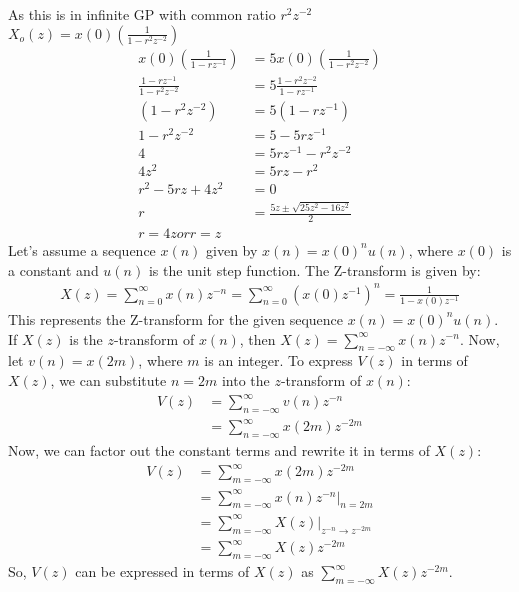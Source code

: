 \documentclass{article}
\begin{document}
As this is in infinite GP with common ratio $r^{2}z^{-2}$\\
$X_o(z)= x(0)\left(\frac{1}{1 - r^2z^{-2}}\right)$ \\
\begin{align}
x(0)\left(\frac{1}{1 - rz^{-1}}\right) &= 5 x(0)\left(\frac{1}{1 - r^2z^{-2}}\right) \\
\frac{1 - rz^{-1}}{1 - r^2z^{-2}} &= 5 \frac{1 - r^2z^{-2}}{1 - rz^{-1}} \\
(1 - r^2z^{-2}) &= 5 (1 - rz^{-1}) \\
1 - r^2z^{-2} &= 5 - 5rz^{-1} \\
4 &= 5rz^{-1} - r^2z^{-2} \\
4z^2 &= 5rz - r^2 \\
r^2 - 5rz + 4z^2 &= 0 \\
r &= \frac{5z \pm \sqrt{25z^2 - 16z^2}}{2}\\
r=4z or r=z
\end{align}
Let's assume a sequence \( x(n) \) given by \( x(n) =x(0)^n u(n) \), where \( x(0) \) is a constant and \( u(n) \) is the unit step function.
The Z-transform is given by:
\begin{align}
X(z) = \sum_{n=0}^{\infty} x(n)z^{-n} = \sum_{n=0}^{\infty} (x(0)z^{-1})^n = \frac{1}{1 - x(0)z^{-1}} 
\end{align}
This represents the Z-transform for the given sequence \( x(n) = x(0)^n u(n) \).\\
If \(X(z)\) is the \(z\)-transform of \(x(n)\), then \(X(z) = \sum_{n=-\infty}^{\infty} x(n)z^{-n}\). Now, let \(v(n)=x(2m)\), where \(m\) is an integer.
To express \(V(z)\) in terms of \(X(z)\), we can substitute \(n=2m\) into the \(z\)-transform of \(x(n)\):
\begin{align}
V(z) & = \sum_{n=-\infty}^{\infty} v(n)z^{-n} \\
     & = \sum_{n=-\infty}^{\infty} x(2m)z^{-2m}
\end{align}
Now, we can factor out the constant terms and rewrite it in terms of \(X(z)\):
\begin{align}
V(z) & = \sum_{m=-\infty}^{\infty} x(2m)z^{-2m} \\
     & = \sum_{m=-\infty}^{\infty} x(n)z^{-n} \Bigg|_{n=2m} \\
     & = \sum_{m=-\infty}^{\infty} X(z) \Bigg|_{z^{-n} \rightarrow z^{-2m}} \\
     & = \sum_{m=-\infty}^{\infty} X(z)z^{-2m}
\end{align}
So, \(V(z)\) can be expressed in terms of \(X(z)\) as \(\sum_{m=-\infty}^{\infty} X(z)z^{-2m}\).
\end{document}
